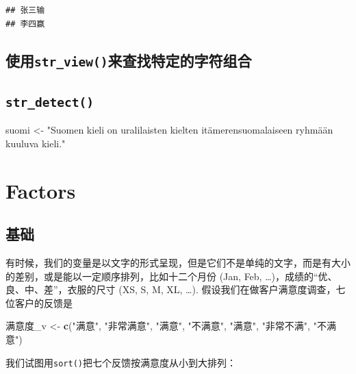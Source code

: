 \documentclass[]{book}
\newenvironment{Shaded}{\begin{snugshade}}{\end{snugshade}}
\newcommand{\KeywordTok}[1]{\textcolor[rgb]{0.13,0.29,0.53}{\textbf{#1}}}
\newcommand{\NormalTok}[1]{#1}
\newcommand{\StringTok}[1]{\textcolor[rgb]{0.31,0.60,0.02}{#1}}
\begin{document}
\begin{verbatim}
## 张三输
## 李四赢
\end{verbatim}

\hypertarget{str_view}{%
\subsection{\texorpdfstring{使用\texttt{str\_view()}来查找特定的字符组合}{使用str\_view()来查找特定的字符组合}}\label{str_view}}

\hypertarget{str_detect}{%
\subsection{\texorpdfstring{\texttt{str\_detect()}}{str\_detect()}}\label{str_detect}}

\begin{Shaded}
\begin{Highlighting}[]
\NormalTok{suomi <-}\StringTok{ "Suomen kieli on uralilaisten kielten itämerensuomalaiseen ryhmään kuuluva kieli."}
\end{Highlighting}
\end{Shaded}

\hypertarget{factors}{%
\section{Factors}\label{factors}}

\hypertarget{-2}{%
\subsection{基础}\label{-2}}

有时候，我们的变量是以文字的形式呈现，但是它们不是单纯的文字，而是有大小的差别，或是能以一定顺序排列，比如十二个月份 (Jan, Feb, \ldots{})，成绩的``优、良、中、差''，衣服的尺寸 (XS, S, M, XL, \ldots{}). 假设我们在做客户满意度调查，七位客户的反馈是

\begin{Shaded}
\begin{Highlighting}[]
\NormalTok{满意度_v <-}\StringTok{ }\KeywordTok{c}\NormalTok{(}\StringTok{"满意"}\NormalTok{, }\StringTok{"非常满意"}\NormalTok{, }\StringTok{"满意"}\NormalTok{, }\StringTok{"不满意"}\NormalTok{, }\StringTok{"满意"}\NormalTok{, }\StringTok{"非常不满"}\NormalTok{,  }\StringTok{"不满意"}\NormalTok{)}
\end{Highlighting}
\end{Shaded}

我们试图用\texttt{sort()}把七个反馈按满意度从小到大排列：
\end{document}
